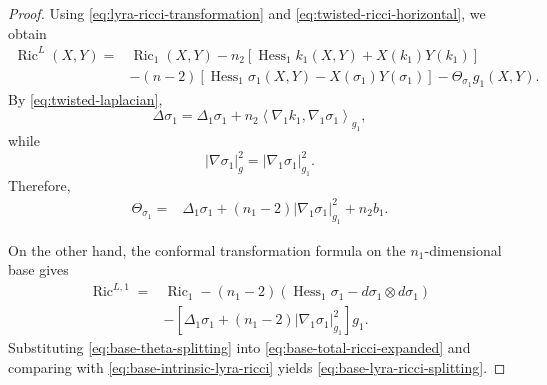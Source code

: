 \documentclass[a4paper,11pt]{article}
\theoremstyle{plain}
\numberwithin{equation}{section}
\begin{document}
\begin{proof}
	Using \eqref{eq:lyra-ricci-transformation} and
	\eqref{eq:twisted-ricci-horizontal}, we obtain
	\begin{align}
		\operatorname{Ric}^{L}(X,Y)
		={}&
		\operatorname{Ric}_{1}(X,Y)
		-
		n_{2}
		\left[
		\operatorname{Hess}_{1}k_{1}(X,Y)
		+
		X(k_{1})Y(k_{1})
		\right]
		\nonumber\\
		&-
		(n-2)
		\left[
		\operatorname{Hess}_{1}\sigma_{1}(X,Y)
		-
		X(\sigma_{1})Y(\sigma_{1})
		\right]
		-
		\Theta_{\sigma_{1}}g_{1}(X,Y).
		\label{eq:base-total-ricci-expanded}
	\end{align}
	By \eqref{eq:twisted-laplacian},
	\begin{equation}
		\Delta\sigma_{1}
		=
		\Delta_{1}\sigma_{1}
		+
		n_{2}
		\left\langle
		\nabla_{1}k_{1},
		\nabla_{1}\sigma_{1}
		\right\rangle_{g_{1}},
		\label{eq:base-scale-laplacian}
	\end{equation}
	while
	\[
	\lvert\nabla\sigma_{1}\rvert_{g}^{2}
	=
	\lvert\nabla_{1}\sigma_{1}\rvert_{g_{1}}^{2}.
	\]
	Therefore,
	\begin{align}
		\Theta_{\sigma_{1}}
		={}&
		\Delta_{1}\sigma_{1}
		+
		(n_{1}-2)
		\lvert\nabla_{1}\sigma_{1}\rvert_{g_{1}}^{2}
		+
		n_{2}b_{1}.
		\label{eq:base-theta-splitting}
	\end{align}
	
	On the other hand, the conformal transformation formula on the
	\(n_{1}\)-dimensional base gives
	\begin{align}
		\operatorname{Ric}^{L,1}
		={}&
		\operatorname{Ric}_{1}
		-
		(n_{1}-2)
		\left(
		\operatorname{Hess}_{1}\sigma_{1}
		-
		d\sigma_{1}\otimes d\sigma_{1}
		\right)
		\nonumber\\
		&-
		\left[
		\Delta_{1}\sigma_{1}
		+
		(n_{1}-2)
		\lvert\nabla_{1}\sigma_{1}\rvert_{g_{1}}^{2}
		\right]g_{1}.
		\label{eq:base-intrinsic-lyra-ricci}
	\end{align}
	Substituting \eqref{eq:base-theta-splitting} into
	\eqref{eq:base-total-ricci-expanded} and comparing with
	\eqref{eq:base-intrinsic-lyra-ricci} yields
	\eqref{eq:base-lyra-ricci-splitting}.
\end{proof}
\end{document}
